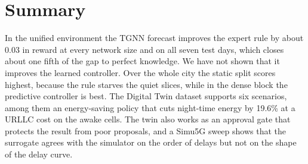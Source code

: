 \section{Summary}
In the unified environment the TGNN forecast improves the expert rule by about 0.03 in reward at every network size and on all seven test days, which closes about one fifth of the gap to perfect knowledge. We have not shown that it improves the learned controller. Over the whole city the static split scores highest, because the rule starves the quiet slices, while in the dense block the predictive controller is best. The Digital Twin dataset supports six scenarios, among them an energy-saving policy that cuts night-time energy by 19.6\% at a URLLC cost on the awake cells. The twin also works as an approval gate that protects the result from poor proposals, and a Simu5G sweep shows that the surrogate agrees with the simulator on the order of delays but not on the shape of the delay curve.
